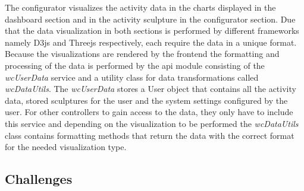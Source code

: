 \documentclass[../medieninformatik-arbeit.tex]{subfiles}
\begin{document}
The configurator visualizes the activity data in the charts displayed in the dashboard section and in the activity sculpture in the configurator section. Due that the data visualization in both sections is performed by different frameworks namely D3js and Threejs respectively, each require the data in a unique format. Because the visualizations are rendered by the frontend the formatting and processing of the data is performed by the api module consisting of the \textit{wcUserData} service and a utility class for data transformations called \textit{wcDataUtils}. The \textit{wcUserData} stores a User object that contains all the activity data, stored sculptures for the user and the system settings configured by the user. For other controllers to gain access to the data, they only have to include this service and depending on the visualization to be performed the \textit{wcDataUtils} class contains formatting methods that return the data with the correct format for the needed visualization type. 

\subsection{Challenges}
\end{document}
